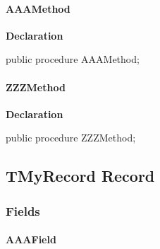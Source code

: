 \documentclass{report}
\begin{document}
\paragraph*{AAAMethod}\hspace*{\fill}

\begin{list}{}{
\setlength{\itemindent}{0cm}
\setlength{\listparindent}{0cm}
\setlength{\leftmargin}{\evensidemargin}
\addtolength{\leftmargin}{\tmplength}
\settowidth{\labelsep}{X}
\addtolength{\leftmargin}{\labelsep}
\setlength{\labelwidth}{\tmplength}
}
\begin{flushleft}
\item[\textbf{Declaration}\hfill]
\begin{ttfamily}
public procedure AAAMethod;\end{ttfamily}


\end{flushleft}
\end{list}
\paragraph*{ZZZMethod}\hspace*{\fill}

\begin{list}{}{
\setlength{\itemindent}{0cm}
\setlength{\listparindent}{0cm}
\setlength{\leftmargin}{\evensidemargin}
\addtolength{\leftmargin}{\tmplength}
\settowidth{\labelsep}{X}
\addtolength{\leftmargin}{\labelsep}
\setlength{\labelwidth}{\tmplength}
}
\begin{flushleft}
\item[\textbf{Declaration}\hfill]
\begin{ttfamily}
public procedure ZZZMethod;\end{ttfamily}


\end{flushleft}
\end{list}
\subsection*{TMyRecord Record}
\subsubsection*{\large{\textbf{Fields}}\normalsize\hspace{1ex}\hfill}
\paragraph*{AAAField}\hspace*{\fill}
\end{document}
